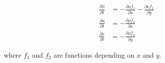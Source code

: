 \begin{align*}
\frac{\partial \rho}{\partial t}  & = -\frac{\partial u f_1}{\partial x}-\frac{\partial v f_1}{\partial y}\\
\frac{\partial u}{\partial t}  & = -\frac{\partial \rho f_2}{\partial x}\\
\frac{\partial v}{\partial t}  & = -\frac{\partial \rho f_2}{\partial y}
\end{align*}

where $f_1$ and $f_2$ are functions depending on $x$ and $y$.

